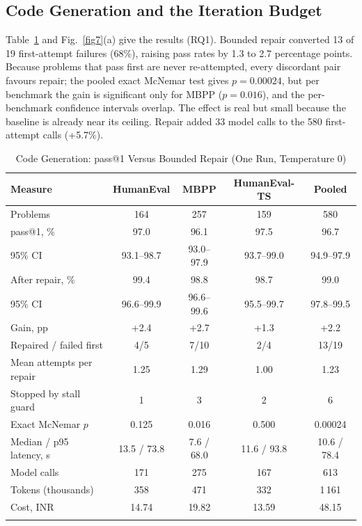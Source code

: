 \documentclass[pdflatex,sn-mathphys-num]{sn-jnl}%
\theoremstyle{thmstyleone}%
\theoremstyle{thmstyletwo}%
\theoremstyle{thmstylethree}%
\begin{document}
\subsection{Code Generation and the Iteration Budget}\label{sec8.3}

Table~\ref{tab4} and Fig.~\ref{fig7}(a) give the results (RQ1). Bounded repair converted 13 of 19 first-attempt failures (68\%), raising pass rates by 1.3 to 2.7 percentage points. Because problems that pass first are never re-attempted, every discordant pair favours repair; the pooled exact McNemar test gives $p = 0.00024$, but per benchmark the gain is significant only for MBPP ($p = 0.016$), and the per-benchmark confidence intervals overlap. The effect is real but small because the baseline is already near its ceiling. Repair added 33 model calls to the 580 first-attempt calls (+5.7\%).

\begin{table}[t]
\caption{Code Generation: pass@1 Versus Bounded Repair (One Run, Temperature 0)}\label{tab4}%
\small
\begin{tabular*}{\textwidth}{@{\extracolsep\fill}lcccc@{}}
\toprule
\textbf{Measure} & \textbf{HumanEval} & \textbf{MBPP} & \textbf{HumanEval-TS} & \textbf{Pooled} \\
\midrule
Problems & 164 & 257 & 159 & 580 \\
pass@1, \% & 97.0 & 96.1 & 97.5 & 96.7 \\
95\% CI & 93.1--98.7 & 93.0--97.9 & 93.7--99.0 & 94.9--97.9 \\
After repair, \% & 99.4 & 98.8 & 98.7 & 99.0 \\
95\% CI & 96.6--99.9 & 96.6--99.6 & 95.5--99.7 & 97.8--99.5 \\
Gain, pp & +2.4 & +2.7 & +1.3 & +2.2 \\
Repaired / failed first & 4/5 & 7/10 & 2/4 & 13/19 \\
Mean attempts per repair & 1.25 & 1.29 & 1.00 & 1.23 \\
Stopped by stall guard & 1 & 3 & 2 & 6 \\
Exact McNemar $p$ & 0.125 & 0.016 & 0.500 & 0.00024 \\
Median / p95 latency, s & 13.5 / 73.8 & 7.6 / 68.0 & 11.6 / 93.8 & 10.6 / 78.4 \\
Model calls & 171 & 275 & 167 & 613 \\
Tokens (thousands) & 358 & 471 & 332 & 1\,161 \\
Cost, INR & 14.74 & 19.82 & 13.59 & 48.15 \\
\botrule
\end{tabular*}
\end{table}
\end{document}
